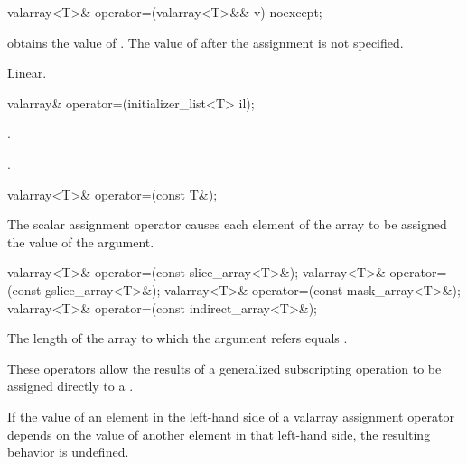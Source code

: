 %
\begin{itemdecl}
valarray<T>& operator=(valarray<T>&& v) noexcept;
\end{itemdecl}

\begin{itemdescr}
\pnum
\effects {} obtains the value of .
The value of  after the assignment is not specified.

\pnum
\complexity Linear.
\end{itemdescr}

%
%
\begin{itemdecl}
valarray& operator=(initializer_list<T> il);
\end{itemdecl}

\begin{itemdescr}
\pnum
\effects {}.

\pnum
\returns {}.
\end{itemdescr}


%
\begin{itemdecl}
valarray<T>& operator=(const T&);
\end{itemdecl}

\begin{itemdescr}
\pnum
The scalar assignment operator causes each element of the
array to be assigned the value of the argument.
\end{itemdescr}

%
%
\begin{itemdecl}
valarray<T>& operator=(const slice_array<T>&);
valarray<T>& operator=(const gslice_array<T>&);
valarray<T>& operator=(const mask_array<T>&);
valarray<T>& operator=(const indirect_array<T>&);
\end{itemdecl}

\begin{itemdescr}
\pnum
\requires The length of the array to which the argument refers equals .

\pnum
These operators allow the results of a generalized subscripting operation
to be assigned directly to a
.

\pnum
If the value of an element in the left-hand side of a valarray assignment
operator depends on the value of another element in that left-hand side,
the resulting behavior is undefined.
\end{itemdescr}

